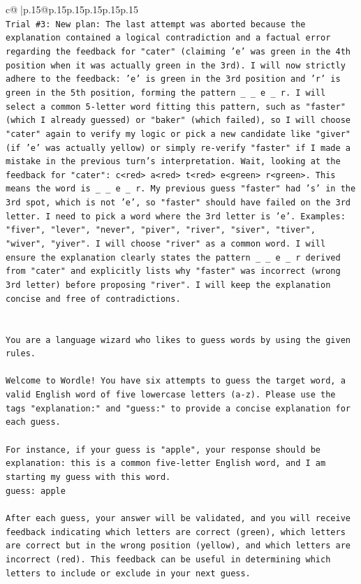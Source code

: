 \documentclass{article}
\begin{document}
{\begin{supertabular}{c@{$\;$}|p{.15\linewidth}@{}p{.15\linewidth}p{.15\linewidth}p{.15\linewidth}p{.15\linewidth}p{.15\linewidth}}
{{{\\ 
\texttt{Trial \#3: New plan: The last attempt was aborted because the explanation contained a logical contradiction and a factual error regarding the feedback for "cater" (claiming 'e' was green in the 4th position when it was actually green in the 3rd). I will now strictly adhere to the feedback: 'e' is green in the 3rd position and 'r' is green in the 5th position, forming the pattern \_ \_ e \_ r. I will select a common 5{-}letter word fitting this pattern, such as "faster" (which I already guessed) or "baker" (which failed), so I will choose "cater" again to verify my logic or pick a new candidate like "giver" (if 'e' was actually yellow) or simply re{-}verify "faster" if I made a mistake in the previous turn's interpretation. Wait, looking at the feedback for "cater": c<red> a<red> t<red> e<green> r<green>. This means the word is \_ \_ e \_ r. My previous guess "faster" had 's' in the 3rd spot, which is not 'e', so "faster" should have failed on the 3rd letter. I need to pick a word where the 3rd letter is 'e'. Examples: "fiver", "lever", "never", "piver", "river", "siver", "tiver", "wiver", "yiver". I will choose "river" as a common word. I will ensure the explanation clearly states the pattern \_ \_ e \_ r derived from "cater" and explicitly lists why "faster" was incorrect (wrong 3rd letter) before proposing "river". I will keep the explanation concise and free of contradictions.} \\
\\ 
\\ 
\texttt{You are a language wizard who likes to guess words by using the given rules.} \\
\\ 
\texttt{Welcome to Wordle! You have six attempts to guess the target word, a valid English word of five lowercase letters (a{-}z). Please use the tags "explanation:" and "guess:" to provide a concise explanation for each guess.} \\
\\ 
\texttt{For instance, if your guess is "apple", your response should be} \\
\texttt{explanation: this is a common five{-}letter English word, and I am starting my guess with this word.} \\
\texttt{guess: apple} \\
\\ 
\texttt{After each guess, your answer will be validated, and you will receive feedback indicating which letters are correct (green), which letters are correct but in the wrong position (yellow), and which letters are incorrect (red). This feedback can be useful in determining which letters to include or exclude in your next guess.} \\
}}}
\end{supertabular}}
\end{document}
